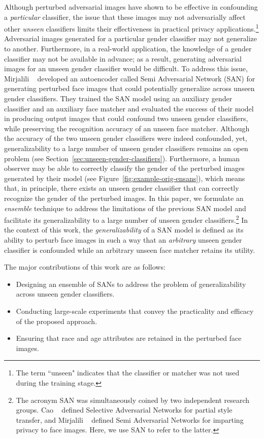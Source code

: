 \documentclass[10pt,twocolumn,letterpaper]{article}
\begin{document}
Although perturbed adversarial images have shown to be effective in confounding a {\em particular} classifier, the issue that these images may not adversarially affect other {\em unseen} classifiers limits their effectiveness in practical privacy applications.\footnote{The term ``unseen" indicates that the classifier or matcher was not used during the training stage.}  Adversarial images generated for a particular gender classifier may not generalize to another. Furthermore, in a real-world application, the knowledge of a gender classifier may not be available in advance; as a result, generating adversarial images for an unseen gender classifier would be difficult. 
To address this issue, Mirjalili \etal~\cite{mirjalili_semi_2018} developed an autoencoder called Semi Adversarial Network (SAN) for generating perturbed face images that could potentially generalize across unseen gender classifiers. They trained the SAN model using an auxiliary gender classifier and an auxiliary face matcher and evaluated the success of their model in producing output images that could confound two unseen gender classifiers, while preserving the recognition accuracy of an unseen face matcher. Although the accuracy of the two unseen gender classifiers were indeed confounded, yet, generalizability to a large number of unseen gender classifiers remains an open problem (see Section~\ref{sec:unseen-gender-classifiers}). Furthermore, a human observer may be able to correctly classify the gender of the perturbed images generated by their model (see Figure~\ref{fig:example-orig-ensans}), which means that, in principle, there exists an unseen gender classifier that can correctly recognize the gender of the perturbed images. In this paper, we formulate an {\em ensemble} technique to address the limitations of the previous SAN model and facilitate its generalizability to a large number of unseen gender classifiers.\footnote{The acronym SAN was simultaneously coined by two independent research groups. Cao \etal~\cite{cao_partial_2017} defined Selective Adversarial Networks for partial style transfer, and Mirjalili \etal~\cite{mirjalili_semi_2018} defined Semi Adversarial Networks for imparting privacy to face images. Here, we use SAN to refer to the latter.} In the context of this work, the \textit{generalizability} of a SAN model is defined as its ability to perturb face images in such a way that an {\em arbitrary} unseen gender classifier is confounded while an arbitrary unseen face matcher retains its utility.


The major contributions of this work are as follows:%
\begin{itemize}[noitemsep,nolistsep]
\item Designing an ensemble of SANs to address the problem of generalizability across unseen gender classifiers.
\item Conducting large-scale experiments that convey the practicality and efficacy of the proposed approach. 
\item Ensuring that race and age attributes are retained in the perturbed face images.
\end{itemize}
\end{document}
